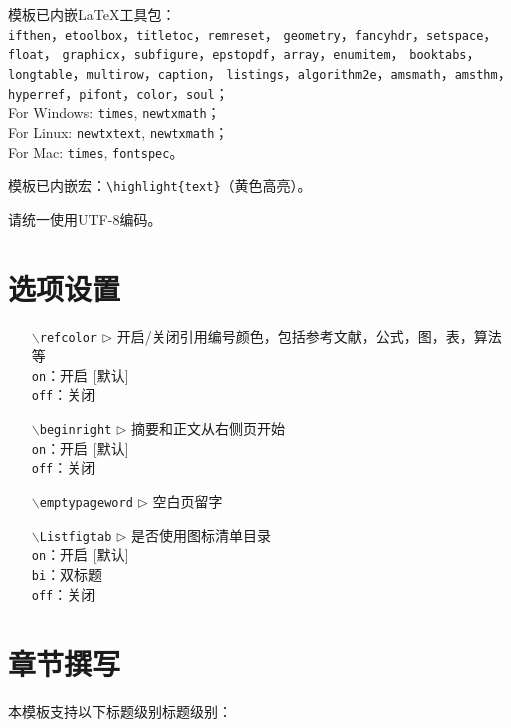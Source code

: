 \setlength{\hangindent}{4em}
模板已内嵌LaTeX工具包：\\
{\tt ifthen}，{\tt etoolbox}，{\tt titletoc}，{\tt remreset}，
{\tt geometry}，{\tt fancyhdr}，{\tt setspace}，{\tt float}，
{\tt graphicx}，{\tt subfigure}，{\tt epstopdf}，{\tt array}，{\tt enumitem}，
{\tt booktabs}，{\tt longtable}，{\tt multirow}，{\tt caption}，
{\tt listings}，{\tt algorithm2e}，{\tt amsmath}，{\tt amsthm}，
{\tt hyperref}，{\tt pifont}，{\tt color}，{\tt soul}；\\
For Windows: {\tt times}, {\tt newtxmath}；\\
For Linux: {\tt newtxtext}, {\tt newtxmath}；\\
For Mac: {\tt times}, {\tt fontspec}。


模板已内嵌宏：\verb|\highlight{text}|（黄色高亮）。

请统一使用UTF-8编码。



\section{选项设置}

\begin{itemize}[leftmargin=3cm]
  \item[{\tt  $\backslash$refcolor} $\triangleright$]  开启/关闭引用编号颜色，包括参考文献，公式，图，表，算法等\\
        \texttt{on}：开启 [默认]\\
        \texttt{off}：关闭
  \item[{\tt $\backslash$beginright} $\triangleright$]  摘要和正文从右侧页开始\\
        \texttt{on}：开启 [默认]\\
        \texttt{off}：关闭
  \item[{\tt $\backslash$emptypageword} $\triangleright$]  空白页留字
  \item[{\tt $\backslash$Listfigtab} $\triangleright$]  是否使用图标清单目录\\
        \texttt{on}：开启 [默认]\\
        \texttt{bi}：双标题\\
        \texttt{off}：关闭
\end{itemize}


\section{章节撰写}
本模板支持以下标题级别标题级别：

